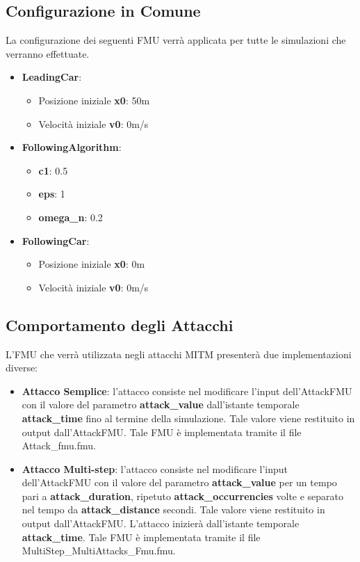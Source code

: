 \subsection{Configurazione in Comune}
La configurazione dei seguenti FMU verrà applicata per tutte le simulazioni che verranno effettuate.
\begin{itemize}
	\item \textbf{LeadingCar}:
	\begin{itemize}
		\item Posizione iniziale \textbf{x0}: 50m
		\item Velocità iniziale \textbf{v0}: 0m/s
	\end{itemize}
	
	\item \textbf{FollowingAlgorithm}:
	\begin{itemize}
		\item \textbf{c1}: 0.5
		\item \textbf{eps}: 1
		\item \textbf{omega\_n}: 0.2
	\end{itemize}
	
	
	\item \textbf{FollowingCar}:
	\begin{itemize}
		\item Posizione iniziale \textbf{x0}: 0m
		\item Velocità iniziale \textbf{v0}: 0m/s
	\end{itemize}
\end{itemize}

\subsection{Comportamento degli Attacchi}
L'FMU che verrà utilizzata negli attacchi MITM presenterà due implementazioni diverse:
\begin{itemize}
\item \textbf{Attacco Semplice}: l'attacco consiste nel modificare l'input dell'AttackFMU con il valore del parametro \textbf{attack\_value} dall'istante temporale \textbf{attack\_time} fino al termine della simulazione. Tale valore viene restituito in output dall'AttackFMU. Tale FMU è implementata tramite il file Attack\_fmu.fmu.
\item \textbf{Attacco Multi-step}: l'attacco consiste nel modificare l'input dell'AttackFMU con il valore del parametro \textbf{attack\_value} per un tempo pari a \textbf{attack\_duration}, ripetuto \textbf{attack\_occurrencies} volte e separato nel tempo da \textbf{attack\_distance} secondi. Tale valore viene restituito in output dall'AttackFMU. L'attacco inizierà dall'istante temporale \textbf{attack\_time}. Tale FMU è implementata tramite il file MultiStep\_MultiAttacks\_Fmu.fmu.

\end{itemize}